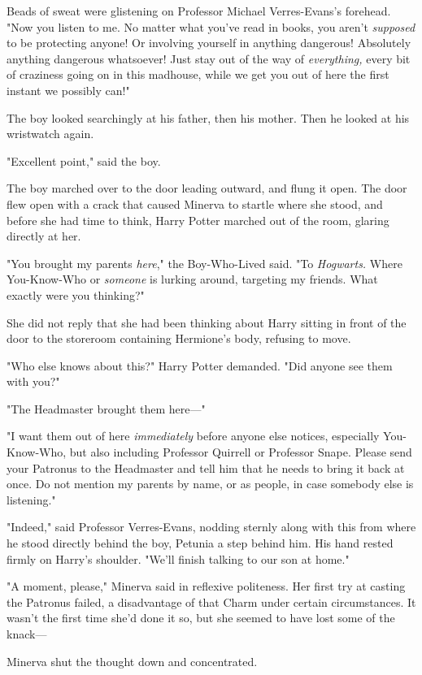 Beads of sweat were glistening on Professor Michael Verres-Evans's forehead.
"Now you listen to me. No matter what you've read in books, you aren't
\emph{supposed} to be protecting anyone! Or involving yourself in anything
dangerous! Absolutely anything dangerous whatsoever! Just stay out of the way
of \emph{everything,} every bit of craziness going on in this madhouse, while
we get you out of here the first instant we possibly can!"

The boy looked searchingly at his father, then his mother. Then he looked at
his wristwatch again.

"Excellent point," said the boy.

The boy marched over to the door leading outward, and flung it open.
\sbreak
The door flew open with a crack that caused Minerva to startle where she stood,
and before she had time to think, Harry Potter marched out of the room, glaring
directly at her.

"You brought my parents \emph{here}," the Boy-Who-Lived said. "To
\emph{Hogwarts.} Where You-Know-Who or \emph{someone} is lurking around,
targeting my friends. What exactly were you thinking?"

She did not reply that she had been thinking about Harry sitting in front of
the door to the storeroom containing Hermione's body, refusing to move.

"Who else knows about this?" Harry Potter demanded. "Did anyone see them with
you?"

"The Headmaster brought them here—"

"I want them out of here \emph{immediately} before anyone else notices,
especially You-Know-Who, but also including Professor Quirrell or Professor
Snape. Please send your Patronus to the Headmaster and tell him that he needs
to bring it back at once. Do not mention my parents by name, or as people, in
case somebody else is listening."

"Indeed," said Professor Verres-Evans, nodding sternly along with this from
where he stood directly behind the boy, Petunia a step behind him. His hand
rested firmly on Harry's shoulder. "We'll finish talking to our son at home."

"A moment, please," Minerva said in reflexive politeness. Her first try at
casting the Patronus failed, a disadvantage of that Charm under certain
circumstances. It wasn't the first time she'd done it so, but she seemed to
have lost some of the knack—

Minerva shut the thought down and concentrated.

